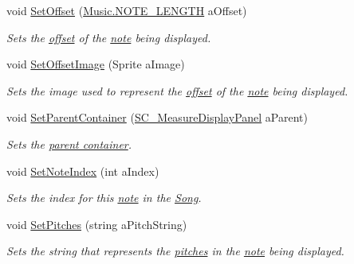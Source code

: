 \begin{DoxyCompactItemize}
void \hyperlink{group___s_c___n_d_p_unity_ga8ff7588e8c3f59a03842feaff92f97e9}{Set\+Offset} (\hyperlink{group___music_enums_gaf11b5f079adbb21c800b9eca1c5c3cbd}{Music.\+N\+O\+T\+E\+\_\+\+L\+E\+N\+G\+TH} a\+Offset)
\begin{DoxyCompactList}\small\item\em Sets the \hyperlink{group___music_structs_ae281187907aed4c728c7981300dbebaf}{offset} of the \hyperlink{group___music_structs_struct_music_1_1_combined_note}{note} being displayed. \end{DoxyCompactList}\item 
void \hyperlink{group___s_c___n_d_p_unity_gaa0a517d1359cd1ed109a130bd52763f1}{Set\+Offset\+Image} (Sprite a\+Image)
\begin{DoxyCompactList}\small\item\em Sets the image used to represent the \hyperlink{group___music_structs_ae281187907aed4c728c7981300dbebaf}{offset} of the \hyperlink{group___music_structs_struct_music_1_1_combined_note}{note} being displayed. \end{DoxyCompactList}\item 
void \hyperlink{group___s_c___n_d_p_unity_gae642b50484b9c7fb2bd3b201aeef726c}{Set\+Parent\+Container} (\hyperlink{class_s_c___measure_display_panel}{S\+C\+\_\+\+Measure\+Display\+Panel} a\+Parent)
\begin{DoxyCompactList}\small\item\em Sets the \hyperlink{group___doc_s_c___m_d_p}{parent container}. \end{DoxyCompactList}\item 
void \hyperlink{group___s_c___n_d_p_unity_gaf3160e3686e44e7718768242438ea1cc}{Set\+Note\+Index} (int a\+Index)
\begin{DoxyCompactList}\small\item\em Sets the index for this \hyperlink{group___music_structs_struct_music_1_1_combined_note}{note} in the \hyperlink{class_song}{Song}. \end{DoxyCompactList}\item 
void \hyperlink{group___s_c___n_d_p_unity_gad9bf776f0c51cf6170faccf9fc4ac7e0}{Set\+Pitches} (string a\+Pitch\+String)
\begin{DoxyCompactList}\small\item\em Sets the string that represents the \hyperlink{group___music_enums_ga508f69b199ea518f935486c990edac1d}{pitches} in the \hyperlink{group___music_structs_struct_music_1_1_combined_note}{note} being displayed. \end{DoxyCompactList}\item 

\end{DoxyCompactItemize}
